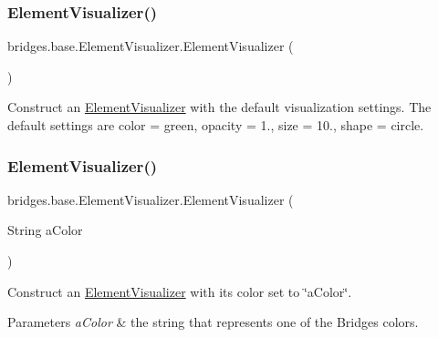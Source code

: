 \subsubsection{\texorpdfstring{Element\+Visualizer()}{ElementVisualizer()}\hspace{0.1cm}{\footnotesize\ttfamily [1/6]}}
{\footnotesize\ttfamily bridges.\+base.\+Element\+Visualizer.\+Element\+Visualizer (\begin{DoxyParamCaption}{ }\end{DoxyParamCaption})}

Construct an \hyperlink{classbridges_1_1base_1_1_element_visualizer}{Element\+Visualizer} with the default visualization settings. The default settings are color = green, opacity = 1., size = 10., shape = circle. \hypertarget{classbridges_1_1base_1_1_element_visualizer_a5c0d9fe8051ebc816372b9836689fdfa}{}\label{classbridges_1_1base_1_1_element_visualizer_a5c0d9fe8051ebc816372b9836689fdfa} 
\subsubsection{\texorpdfstring{Element\+Visualizer()}{ElementVisualizer()}\hspace{0.1cm}{\footnotesize\ttfamily [2/6]}}
{\footnotesize\ttfamily bridges.\+base.\+Element\+Visualizer.\+Element\+Visualizer (\begin{DoxyParamCaption}\item[{String}]{a\+Color }\end{DoxyParamCaption})}

Construct an \hyperlink{classbridges_1_1base_1_1_element_visualizer}{Element\+Visualizer} with its color set to \char`\"{}a\+Color\char`\"{}.


\begin{DoxyParams}{Parameters}
{\em a\+Color} & the string that represents one of the Bridges colors. \\
\hline
\end{DoxyParams}
\hypertarget{classbridges_1_1base_1_1_element_visualizer_ab62b1b06907fbeddfcee2b4b297e1021}{}\label{classbridges_1_1base_1_1_element_visualizer_ab62b1b06907fbeddfcee2b4b297e1021} 
